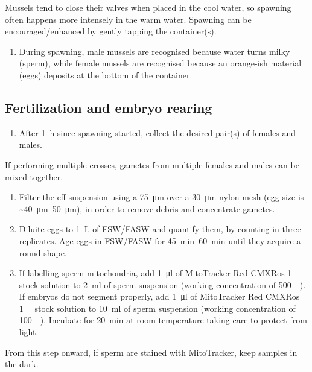 \documentclass[10pt]{report}
\begin{document}
\bigskip\alert{Mussels tend to close their valves when placed in the cool water, so spawning often happens more intensely in the warm water.}
\alert{Spawning can be encouraged/enhanced by gently tapping the container(s).}

\begin{enumerate}[resume = steps]
	\item During spawning, male mussels are recognised because water turns milky (sperm), while female mussels are recognised because an orange-ish material (eggs) deposits at the bottom of the container.
\end{enumerate}


\subsection*{Fertilization and embryo rearing}
\begin{enumerate}[series = steps]
	\item After \qty{1}{\hour} since spawning started, collect the desired pair(s) of females and males.
\end{enumerate}

\bigskip\alert{If performing multiple crosses, gametes from multiple females and males can be mixed together.}

\begin{enumerate}[resume = steps]
	\item Filter the eff suspension using a \qty{75}{\um} over a \qty{30}{\um} nylon mesh (egg size is \qtyrange{~40}{50}{\um}), in order to remove debris and concentrate gametes.
	\item Diluite eggs to \qty{1}{\liter} of FSW/FASW and quantify them, by counting in three replicates. Age eggs in FSW/FASW for \qtyrange{45}{60}{\minute} until they acquire a round shape.
	\item If labelling sperm mitochondria, add \qty{1}{\ul} of MitoTracker\texttrademark{} Red CMXRos \qty{1}{\milli\molar} stock solution to \qty{2}{\ml} of sperm suspension (working concentration of \qty{500}{\nano\molar}). If embryos do not segment properly, add \qty{1}{\ul} of MitoTracker\texttrademark{} Red CMXRos \qty{1}{\milli\molar} stock solution to \qty{10}{\ml} of sperm suspension (working concentration of \qty{100}{\nano\molar}). Incubate for \qty{20}{\minute} at room temperature taking care to protect from light.
\end{enumerate}

\bigskip\alert{From this step onward, if sperm are stained with MitoTracker, keep samples in the dark.}
\end{document}
